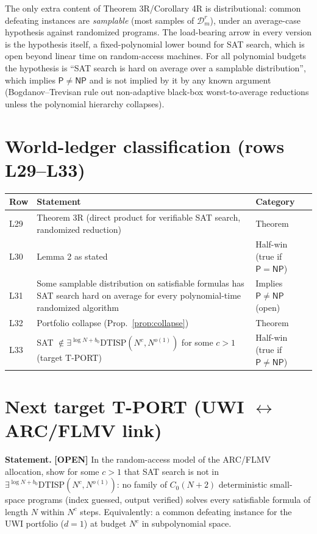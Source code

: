 \documentclass[11pt]{article}
\theoremstyle{remark}
\newcommand{\cP}{\mathsf{P}}
\newcommand{\NP}{\mathsf{NP}}
\newcommand{\D}{\mathcal{D}}
\newcommand{\status}[1]{\textbf{[#1]}}
\newcommand{\DTISP}{\mathrm{DTISP}}
\begin{document}
\noindent The only extra content of Theorem 3R/Corollary 4R is distributional: common defeating
instances are \emph{samplable} (most samples of $\D_m^r$), under an average-case hypothesis against
randomized programs. The load-bearing arrow in every version is the hypothesis itself, a
fixed-polynomial lower bound for SAT search, which is open beyond linear time on random-access machines.
For all polynomial budgets the hypothesis is ``SAT search is hard on average over a samplable
distribution'', which implies $\cP\neq\NP$ and is not implied by it by any known argument
(Bogdanov--Trevisan rule out non-adaptive black-box worst-to-average reductions unless the polynomial
hierarchy collapses).

\section{World-ledger classification (rows L29--L33)}

\begin{center}
\begin{tabular}{lp{}l}
Row & Statement & Category \\ \hline
L29 & Theorem 3R (direct product for verifiable SAT search, randomized reduction) & Theorem \\
L30 & Lemma 2 as stated & Half-win (true if $\cP=\NP$) \\
L31 & Some samplable distribution on satisfiable formulas has SAT search hard on average for every
polynomial-time randomized algorithm & Implies $\cP\neq\NP$ (open) \\
L32 & Portfolio collapse (Prop.~\ref{prop:collapse}) & Theorem \\
L33 & SAT $\notin\exists^{\log N+b_0}\DTISP(N^c,N^{o(1)})$ for some $c>1$ (target T-PORT) &
Half-win (true if $\cP\neq\NP$) \\
\end{tabular}
\end{center}

\section{Next target T-PORT (UWI $\leftrightarrow$ ARC/FLMV link)}\label{sec:next}

\noindent\textbf{Statement.} \status{OPEN} In the random-access model of the ARC/FLMV allocation, show for
some $c>1$ that SAT search is not in $\exists^{\log N+b_0}\DTISP(N^c,N^{o(1)})$: no family of
$C_0(N+2)$ deterministic small-space programs (index guessed, output verified) solves every satisfiable
formula of length $N$ within $N^c$ steps. Equivalently: a common defeating instance for the UWI
portfolio ($d=1$) at budget $N^c$ in subpolynomial space.
\end{document}
